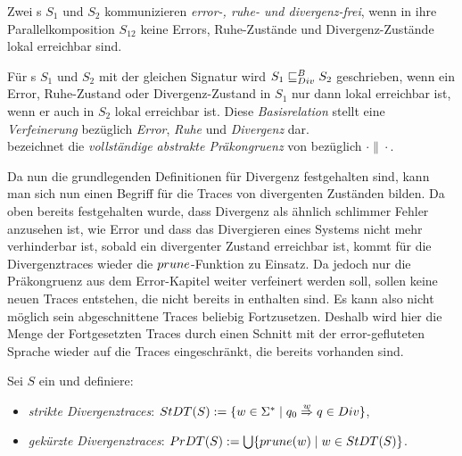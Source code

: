 \begin{Def}
  Zwei \EIO{}s $S_1$ und $S_2$ kommunizieren \emph{error-, ruhe- und
  divergenz-frei}, wenn in ihre Parallelkomposition $S_{12}$ keine Errors,
  Ruhe-Zustände und Divergenz-Zustände lokal erreichbar sind.
\end{Def}

\begin{Def}
\label{DefDivBasisrel}
Für \EIO{}s $S_1$ und $S_2$ mit der gleichen Signatur wird $S_1\sqsubseteq _{Div}^B S_2$
geschrieben, wenn ein Error, Ruhe-Zustand oder Divergenz-Zustand in $S_1$ nur
dann lokal erreichbar ist, wenn er auch in $S_2$ lokal erreichbar ist. Diese
\emph{Basisrelation} stellt eine \emph{Verfeinerung} bezüglich \emph{Error},
\emph{Ruhe} und \emph{Divergenz} dar.\\
\DCRel{} bezeichnet die \emph{vollständige abstrakte Präkongruenz} von \DBRel{}
bezüglich $\cdot\|\cdot$.
\end{Def}

Da nun die grundlegenden Definitionen für Divergenz festgehalten sind,
kann man sich nun einen Begriff für die Traces von divergenten Zuständen
bilden. Da oben bereits festgehalten wurde, dass Divergenz als ähnlich
\glqq{}schlimmer\grqq{} Fehler anzusehen ist, wie Error und dass das Divergieren
eines Systems nicht mehr verhinderbar ist, sobald ein divergenter Zustand
erreichbar ist, kommt für die Divergenztraces wieder die $prune$-Funktion zu
Einsatz. Da jedoch nur die Präkongruenz aus dem Error-Kapitel weiter verfeinert
werden soll, sollen keine neuen Traces entstehen, die nicht bereits in \EL{}
enthalten sind. Es kann also nicht möglich sein abgeschnittene Traces beliebig
Fortzusetzen. Deshalb wird hier die Menge der Fortgesetzten Traces durch einen
Schnitt mit der error-gefluteten Sprache \EL{} wieder auf die Traces
eingeschränkt, die bereits vorhanden sind.

\begin{Def}[Divergenztraces]
  Sei $S$ ein \EIO{} und definiere:
  \begin{itemize}
    \item \emph{strikte Divergenztraces}: $StDT{}(S) := \{w\in\Sigma ^*\mid
      q_0 \overset{w}{\Rightarrow} q\in Div\}$,
    \item \emph{gekürzte Divergenztraces}: $PrDT{}(S) :=
      \bigcup\{prune{}(w)\mid w\in StDT{}(S)\}$.
  \end{itemize}
\end{Def}

